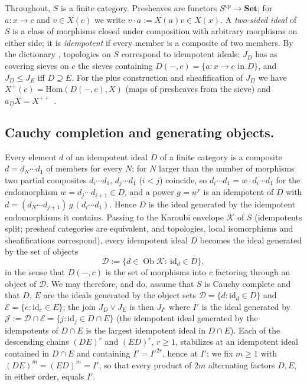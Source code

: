 \documentclass[11pt]{amsart}
\theoremstyle{definition}
\newcommand{\Hom}{\mathrm{Hom}}
\newcommand{\sD}{\mathcal D}
\newcommand{\sE}{\mathcal E}
\newcommand{\sJ}{\mathcal J}
\newcommand{\sK}{\mathcal K}
\begin{document}
Throughout, $S$ is a finite category. Presheaves are functors
$S^{\mathrm{op}}\to\mathbf{Set}$; for $a\colon x\to c$ and $v\in X(c)$ we write
$v\cdot a:=X(a)v\in X(x)$. A \emph{two-sided ideal} of $S$ is a class of
morphisms closed under composition with arbitrary morphisms on either side; it
is \emph{idempotent} if every member is a composite of two members. By the
dictionary \cite[Thm.~5.1]{Postnikov}, topologies on $S$ correspond to
idempotent ideals: $J_D$ has as covering sieves on $c$ the sieves containing
$D(-,c)=\{a\colon x\to c\text{ in }D\}$, and $J_D\le J_E$ iff $D\supseteq E$.
For the plus construction and sheafification of $J_D$ we have
$X^{+}(c)=\Hom(D(-,c),X)$ (maps of presheaves from the sieve) and
$a_DX=X^{++}$ \cite[III.5]{MLM}.

\subsection{Cauchy completion and generating objects.}
Every element $d$ of an idempotent ideal $D$ of a finite category is a
composite $d=d_N\cdots d_1$ of members for every $N$; for $N$ larger than the
number of morphisms two partial composites $d_i\cdots d_1$, $d_j\cdots d_1$
($i<j$) coincide, so $d_i\cdots d_1=w\cdot d_i\cdots d_1$ for the endomorphism
$w=d_j\cdots d_{i+1}\in D$, and a power $g=w^r$ is an idempotent of $D$ with
$d=(d_N\cdots d_{j+1})\,g\,(d_i\cdots d_1)$. Hence $D$ is the ideal generated
by the idempotent endomorphisms it contains. Passing to the Karoubi envelope
$\sK$ of $S$ (idempotents split; presheaf categories are equivalent, and
topologies, local isomorphisms and sheafifications correspond), every
idempotent ideal $D$ becomes the ideal generated by the set of objects
\[
\sD:=\{d\in\operatorname{Ob}\sK:\ \mathrm{id}_d\in D\},
\]
in the sense that $D(-,c)$ is the set of morphisms into $c$ factoring through
an object of $\sD$. We may therefore, and do, assume that $S$ is Cauchy
complete and that $D$, $E$ are the ideals generated by the object sets
$\sD=\{d:\mathrm{id}_d\in D\}$ and $\sE=\{e:\mathrm{id}_e\in E\}$; the join
$J_D\vee J_E$ is then $J_{I'}$ where $I'$ is the ideal generated by
$\sJ:=\sD\cap\sE=\{j:\mathrm{id}_j\in D\cap E\}$ (the idempotent ideal generated
by the idempotents of $D\cap E$ is the largest idempotent ideal in $D\cap E$).
Each of the descending chains $(DE)^r$ and $(ED)^r$, $r\ge1$, stabilizes at an
idempotent ideal contained in $D\cap E$ and containing $I'=I'^{2r}$, hence at
$I'$; we fix $m\ge1$ with $(DE)^m=(ED)^m=I'$, so that every product of $2m$
alternating factors $D,E$, in either order, equals $I'$.
\end{document}
